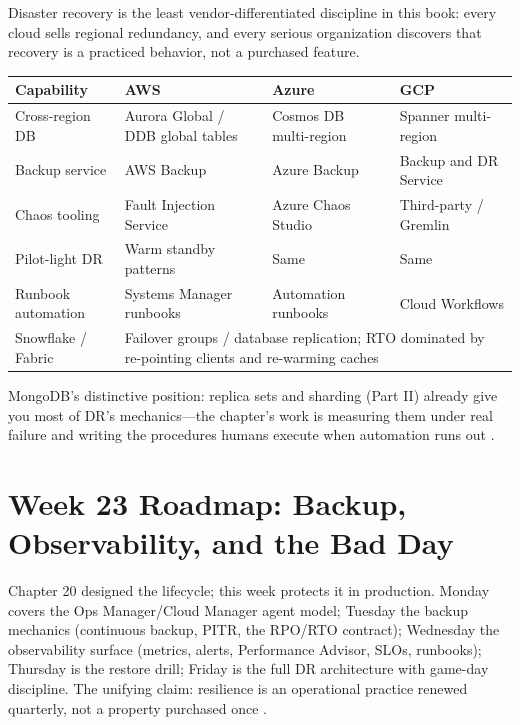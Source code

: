 \begin{crosscloud}
Disaster recovery is the least vendor-differentiated discipline in this book: every cloud sells regional redundancy, and every serious organization discovers that recovery is a practiced behavior, not a purchased feature.

\vspace{2mm}
{\footnotesize
\begin{tabular}{@{}p{2.9cm}p{3.0cm}p{3.0cm}p{3.0cm}@{}} 
\toprule
\textbf{Capability} & \textbf{AWS} & \textbf{Azure} & \textbf{GCP} \\
\midrule
Cross-region DB & Aurora Global / DDB global tables & Cosmos DB multi-region & Spanner multi-region \\
Backup service & AWS Backup & Azure Backup & Backup and DR Service \\
Chaos tooling & Fault Injection Service & Azure Chaos Studio & Third-party / Gremlin \\
Pilot-light DR & Warm standby patterns & Same & Same \\
Runbook automation & Systems Manager runbooks & Automation runbooks & Cloud Workflows \\
\addlinespace
Snowflake / Fabric & \multicolumn{3}{l}{Failover groups / database replication; RTO dominated by re-pointing clients and re-warming caches} \\
\bottomrule
\end{tabular}}

\vspace{1mm}
MongoDB's distinctive position: replica sets and sharding (Part II) already give you most of DR's mechanics---the chapter's work is measuring them under real failure and writing the procedures humans execute when automation runs out \cite{mongodbOpsManagerDocs,sreBook}.
\end{crosscloud}

\section{Week 23 Roadmap: Backup, Observability, and the Bad Day}
Chapter 20 designed the lifecycle; this week protects it in production. Monday covers the Ops Manager/Cloud Manager agent model; Tuesday the backup mechanics (continuous backup, PITR, the RPO/RTO contract); Wednesday the observability surface (metrics, alerts, Performance Advisor, SLOs, runbooks); Thursday is the restore drill; Friday is the full DR architecture with game-day discipline. The unifying claim: resilience is an operational practice renewed quarterly, not a property purchased once \cite{sreBook}.

